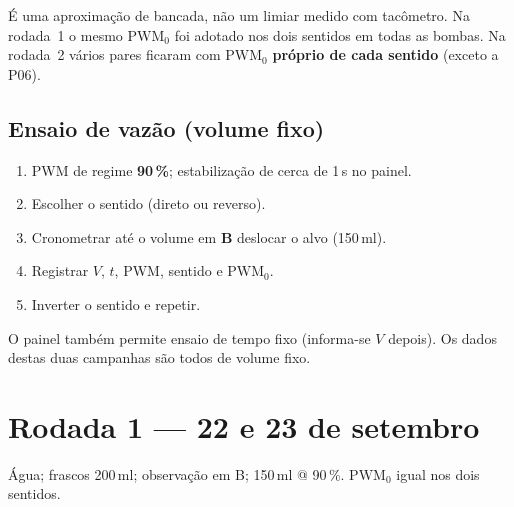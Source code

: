 \documentclass[11pt,a4paper]{article}
\newcommand{\pwmz}{\mathrm{PWM}_0}
\begin{document}
É uma aproximação de bancada, não um limiar medido com tacômetro. Na rodada~1
o mesmo $\pwmz$ foi adotado nos dois sentidos em todas as bombas. Na rodada~2
vários pares ficaram com $\pwmz$ \textbf{próprio de cada sentido} (exceto a P06).

\subsection{Ensaio de vazão (volume fixo)}

\begin{enumerate}
  \item PWM de regime \textbf{90\,\%}; estabilização de cerca de 1\,s no painel.
  \item Escolher o sentido (direto ou reverso).
  \item Cronometrar até o volume em \textbf{B} deslocar o alvo (150\,ml).
  \item Registrar $V$, $t$, PWM, sentido e $\pwmz$.
  \item Inverter o sentido e repetir.
\end{enumerate}

O painel também permite ensaio de tempo fixo (informa-se $V$ depois). Os dados
destas duas campanhas são todos de volume fixo.

\section{Rodada 1 --- 22 e 23 de setembro}

Água; frascos 200\,ml; observação em B; 150\,ml @ 90\,\%.
$\pwmz$ igual nos dois sentidos.
\end{document}
